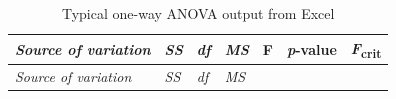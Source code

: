 \documentclass[
]{krantz}
\begin{document}
\begin{longtable}[]{@{}
  >{\raggedright\arraybackslash}p{}
  >{\raggedright\arraybackslash}p{}
  >{\raggedright\arraybackslash}p{}
  >{\raggedright\arraybackslash}p{}
  >{\raggedright\arraybackslash}p{}
  >{\raggedright\arraybackslash}p{}
  >{\raggedright\arraybackslash}p{}@{}}
\caption{\label{tab:anovaoutput} Typical one-way ANOVA output from Excel}\tabularnewline
\toprule\noalign{}
\begin{minipage}[b]{\linewidth}\raggedright
\emph{Source of variation}
\end{minipage} & \begin{minipage}[b]{\linewidth}\raggedright
\emph{SS}
\end{minipage} & \begin{minipage}[b]{\linewidth}\raggedright
\emph{df}
\end{minipage} & \begin{minipage}[b]{\linewidth}\raggedright
\emph{MS}
\end{minipage} & \begin{minipage}[b]{\linewidth}\raggedright
F
\end{minipage} & \begin{minipage}[b]{\linewidth}\raggedright
\emph{p}-value
\end{minipage} & \begin{minipage}[b]{\linewidth}\raggedright
\emph{F}\textsubscript{crit}
\end{minipage} \\
\midrule\noalign{}
\endfirsthead
\toprule\noalign{}
\begin{minipage}[b]{\linewidth}\raggedright
\emph{Source of variation}
\end{minipage} & \begin{minipage}[b]{\linewidth}\raggedright
\emph{SS}
\end{minipage} & \begin{minipage}[b]{\linewidth}\raggedright
\emph{df}
\end{minipage} & \begin{minipage}[b]{\linewidth}\raggedright
\emph{MS}
\end{minipage} & \begin{minipage}[b]{\linewidth}\raggedright

\end{minipage}
\end{longtable}
\end{document}
